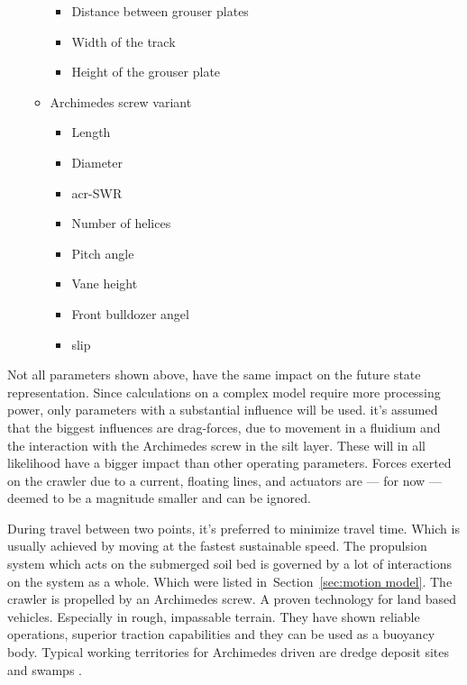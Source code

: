 \begin{itemize}
\begin{itemize}
\begin{itemize}
			\item Distance between grouser plates\footnotemark[\getrefnumber{c}]
			\item Width of the track\footnotemark[\getrefnumber{c}]
			\item Height of the grouser plate\footnotemark[\getrefnumber{c}]
		\end{itemize}
		\item Archimedes screw variant \cite{van_der_zee_prediction_2009}
		\begin{itemize}
			\setlength\itemsep{0mm}
			\item Length\footnotemark[\getrefnumber{c}]
			\item Diameter\footnotemark[\getrefnumber{c}]
			\item \gls{acr-SWR}\footnotemark[\getrefnumber{c}]
			\item Number of helices\footnotemark[\getrefnumber{c}]
			\item Pitch angle\footnotemark[\getrefnumber{c}]
			\item Vane height\footnotemark[\getrefnumber{c}]
			\item Front bulldozer angel\footnotemark[\getrefnumber{c}]
			\item slip
		\end{itemize}
	\end{itemize}
\end{itemize}

Not all parameters shown above, have the same impact on the future state representation. Since calculations on a complex
model require more processing power, only parameters with a substantial influence will be used. it's assumed that the
biggest influences are drag-forces, due to movement in a fluidium and the interaction with the Archimedes screw in the
silt layer. These will in all likelihood have a bigger impact than other operating parameters. Forces exerted on the
crawler due to a current, floating lines, and actuators are --- for now --- deemed to be a magnitude smaller and can
be ignored.

During travel between two points, it's preferred to minimize travel time. Which is usually achieved by moving at the
fastest sustainable speed. The propulsion system which acts on the submerged soil bed is governed by a lot of
interactions on the system as a whole. Which were listed in~Section~\ref{sec:motion model}. The crawler is propelled by
an Archimedes screw. A proven technology for land based vehicles. Especially in rough, impassable terrain. They have
shown reliable operations, superior traction capabilities and they can be used as a buoyancy body. Typical working
territories for Archimedes driven are dredge deposit sites and swamps \citet{lotman_deep_2011}.


